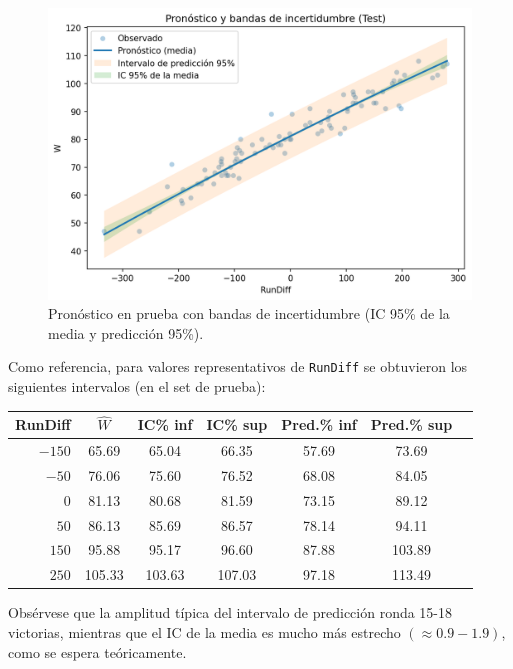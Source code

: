 \documentclass[10pt]{article}
\begin{document}
\begin{figure}[H]
    \centering
    \includegraphics[width=.85\linewidth]{../plots/forecast_intervals_vs_rundiff_test.png}
    \caption{Pronóstico en prueba con bandas de incertidumbre (IC 95\% de la media y predicción 95\%).}
    \label{fig:forecast_bands}
\end{figure}

Como referencia, para valores representativos de \texttt{RunDiff} se obtuvieron los siguientes intervalos (en el set de prueba):

\begin{center}
    \begin{tabular}{rcccccc}
        \toprule
            RunDiff & $\hat{W}$ & IC\;95\% inf & IC\;95\% sup & Pred.\;95\% inf & Pred.\;95\% sup \\
        \midrule
            $-150$ & 65.69 & 65.04 & 66.35 & 57.69 & 73.69 \\
            $-50$  & 76.06 & 75.60 & 76.52 & 68.08 & 84.05 \\
            $0$    & 81.13 & 80.68 & 81.59 & 73.15 & 89.12 \\
            $50$   & 86.13 & 85.69 & 86.57 & 78.14 & 94.11 \\
            $150$  & 95.88 & 95.17 & 96.60 & 87.88 & 103.89 \\
            $250$  & 105.33 & 103.63 & 107.03 & 97.18 & 113.49 \\
        \bottomrule
    \end{tabular}
\end{center}
Obsérvese que la amplitud típica del intervalo de predicción ronda 15-18 victorias, mientras que el IC de la media es mucho más estrecho $(\approx0.9-1.9)$, como se espera teóricamente.
\end{document}
